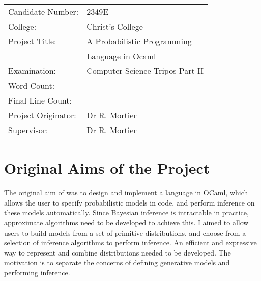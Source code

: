 \immediate{}
\immediate{}

{\large
	\begin{tabular}{ll}
		Candidate Number:   & 2349E                                 \\
		College:            & Christ's College                      \\
		Project Title:      & A Probabilistic Programming           \\
		                    & Language in Ocaml                     \\
		Examination:        & Computer Science Tripos Part II       \\
		Word Count:         & \footnotemark[1] \\
		Final Line Count:   & \footnotemark[2] \\
		Project Originator: & Dr R. Mortier                         \\
		Supervisor:         & Dr R. Mortier                         \\ 
	\end{tabular} 
}


\section*{Original Aims of the Project}

The original aim of was to design and implement a language in OCaml, which allows the user to specify probabilistic models in code, and perform inference on these models automatically. Since Bayesian inference is intractable in practice, approximate algorithms need to be developed to achieve this. I aimed to allow users to build models from a set of primitive distributions, and choose from a selection of inference algorithms to perform inference. An efficient and expressive way to represent and combine distributions needed to be developed. The motivation is to separate the concerns of defining generative models and performing inference.

